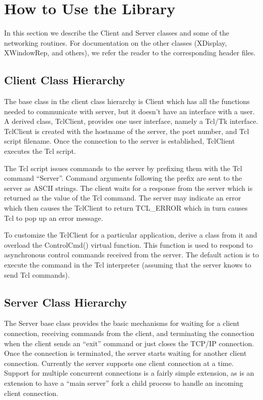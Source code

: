 \section{How to Use the Library\label{usage}}

In this section we describe the Client and Server classes and some of
the networking routines. For documentation on the other classes
(XDisplay, XWindowRep, and others), we refer the reader to the
corresponding header files.

\subsection{Client Class Hierarchy}

The base class in the client class hierarchy is Client which has all
the functions needed to communicate with server, but it doesn't have
an interface with a user. A derived class, TclClient, provides one
user interface, namely a Tcl/Tk interface. TclClient is created with
the hostname of the server, the port number, and Tcl script filename.
Once the connection to the server is established, TclClient executes
the Tcl script.

The Tcl script issues commands to the server by prefixing them with
the Tcl command ``Server''. Command arguments following the prefix are
sent to the server as ASCII strings. The client waits for a response
from the server which is returned as the value of the Tcl command.
The server may indicate an error which then causes the TclClient to
return TCL\_ERROR which in turn causes Tcl to pop up an error message.

To customize the TclClient for a particular application, derive a
class from it and overload the ControlCmd() virtual function. This
function is used to respond to asynchronous control commands received
from the server. The default action is to execute the command in the
Tcl interpreter (assuming that the server knows to send Tcl commands).

\subsection{Server Class Hierarchy}

The Server base class provides the basic mechanisms for waiting for a
client connection, receiving commands from the client, and terminating
the connection when the client sends an ``exit'' command or just
closes the TCP/IP connection. Once the connection is terminated, the
server starts waiting for another client connection. Currently the
server supports one client connection at a time. Support for multiple
concurrent connections is a fairly simple extension, as is an
extension to have a ``main server'' fork a child process to handle an
incoming client connection.

